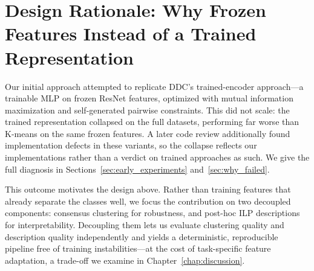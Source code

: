
\section{Design Rationale: Why Frozen Features Instead of a Trained Representation}
\label{sec:design_rationale}

Our initial approach attempted to replicate DDC's trained-encoder approach---a trainable MLP on frozen ResNet features, optimized with mutual information maximization and self-generated pairwise constraints. This did not scale: the trained representation collapsed on the full datasets, performing far worse than K-means on the same frozen features. A later code review additionally found implementation defects in these variants, so the collapse reflects our implementations rather than a verdict on trained approaches as such. We give the full diagnosis in Sections~\ref{sec:early_experiments} and~\ref{sec:why_failed}.

This outcome motivates the design above. Rather than training features that already separate the classes well, we focus the contribution on two decoupled components: consensus clustering for robustness, and post-hoc ILP descriptions for interpretability. Decoupling them lets us evaluate clustering quality and description quality independently and yields a deterministic, reproducible pipeline free of training instabilities---at the cost of task-specific feature adaptation, a trade-off we examine in Chapter~\ref{chap:discussion}.